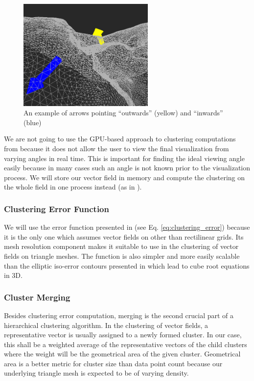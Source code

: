 \begin{figure}[h]
\centering
\includegraphics[width=0.6\textwidth]{./img/meshdiff-orientation.PNG}
\caption{An example of arrows pointing ``outwards'' (yellow) and ``inwards'' (blue)}
\label{fig:meshdiff-orientation}
\end{figure}

We are not going to use the GPU-based approach to clustering computations from \citet{Peng12} because it does not allow the user to view the final visualization from varying angles in real time. This is important for finding the ideal viewing angle easily because in many cases such an angle is not known prior to the visualization process. We will store our vector field in memory and compute the clustering on the whole field in one process instead (as in \citet{Telea99}).

\subsubsection{Clustering Error Function}

We will use the error function presented in \citet{Peng12} (see Eq. \ref{eq:clustering_error}) because it is the only one which assumes vector fields on other than rectilinear grids. Its mesh resolution component makes it suitable to use in the clustering of vector fields on triangle meshes. The function is also simpler and more easily scalable than the elliptic iso-error contours presented in \citet{Telea99} which lead to cube root equations in 3D.

\subsubsection{Cluster Merging}

Besides clustering error computation, merging is the second crucial part of a hierarchical clustering algorithm. In the clustering of vector fields, a representative vector is usually assigned to a newly formed cluster. In our case, this shall be a weighted average of the representative vectors of the child clusters where the weight will be the geometrical area of the given cluster. Geometrical area is a better metric for cluster size than data point count because our underlying triangle mesh is expected to be of varying density.

